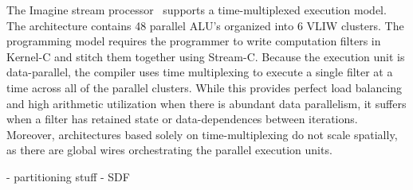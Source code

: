 
The Imagine stream processor~\cite{rixner98bandwidthefficient}
supports a time-multiplexed execution model.  The architecture
contains 48 parallel ALU's organized into 6 VLIW clusters.  The
programming model requires the programmer to write computation filters
in Kernel-C and stitch them together using Stream-C.  Because the
execution unit is data-parallel, the compiler uses time multiplexing
to execute a single filter at a time across all of the parallel
clusters.  While this provides perfect load balancing and high
arithmetic utilization when there is abundant data parallelism, it
suffers when a filter has retained state or data-dependences between
iterations.  Moreover, architectures based solely on
time-multiplexing do not scale spatially, as there are global wires
orchestrating the parallel execution units. 

- partitioning stuff
- SDF
